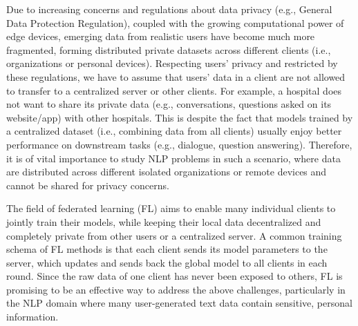 Due to increasing concerns and regulations about data privacy (e.g., General Data Protection Regulation), coupled with the growing computational power of edge devices, emerging data from realistic users have become much more fragmented, forming distributed private datasets across different clients (i.e., organizations or personal devices). Respecting users’ privacy and restricted by these regulations, we have to assume that users’ data in a client are not allowed to transfer to a centralized server or other clients. For example, a hospital does not want to share its private data (e.g., conversations, questions asked on its website/app) with other hospitals. This is despite the fact that models trained by a centralized dataset (i.e., combining data from all clients) usually enjoy better performance on downstream tasks (e.g., dialogue, question answering). Therefore, it is of vital importance to study NLP problems in such a scenario, where data are distributed across different isolated organizations or remote devices and cannot be shared for privacy concerns.

The field of federated learning (FL) aims to enable many individual clients to jointly train their models, while keeping their local data decentralized and completely private from other users or a centralized server. A common training schema of FL methods is that each client sends its model parameters to the server, which updates and sends back the global model to all clients in each round. Since the raw data of one client has never been exposed to others, FL is promising to be an effective way to address the above challenges, particularly in the NLP domain where many user-generated text data contain sensitive, personal information.